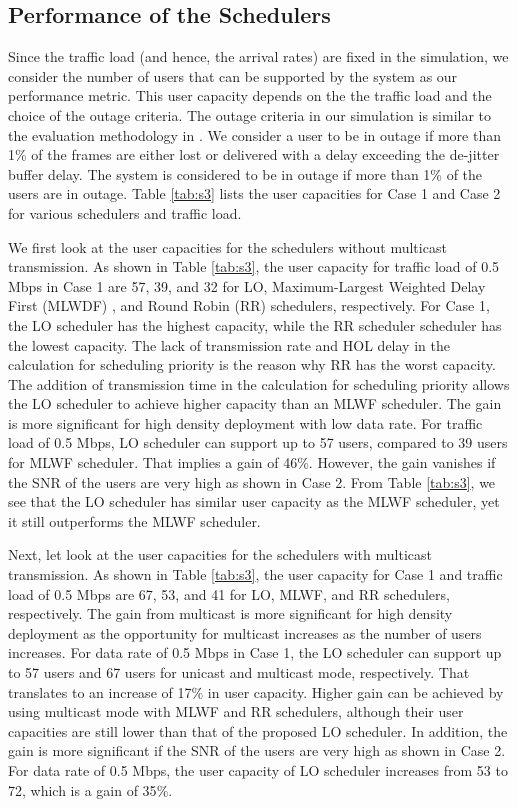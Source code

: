 \documentclass[conference]{IEEEtran}
\newcommand{\0}{\vect{0}}
\newcommand{\1}{\vect{1}}
\begin{document}
\subsection{Performance of the Schedulers}

Since the traffic load (and hence, the arrival rates) are fixed in the simulation, we consider the  number of users that can be supported by the system as our performance metric. This user capacity depends on the the traffic load and the choice of the outage criteria. The outage criteria in our simulation is similar to the evaluation methodology in \cite{3GPPTR25.814}. We consider a user to be in outage if more than 1\% of the frames are either lost or delivered with a delay exceeding the de-jitter buffer delay. The system is considered to be in outage if more than 1\% of the users are in outage. Table \ref{tab:s3} lists the user capacities for Case 1 and Case 2 for various schedulers and traffic load.


We first look at the user capacities for the schedulers without multicast transmission. As shown in Table \ref{tab:s3}, the user capacity for traffic load of 0.5 Mbps in Case 1 are 57, 39, and 32 for LO,  Maximum-Largest Weighted Delay First (MLWDF)  \cite{Sto01AP}, and Round Robin (RR) schedulers, respectively. For Case 1, the LO scheduler has the highest capacity, while the RR scheduler scheduler has the lowest capacity. The lack of transmission rate and HOL delay in the calculation for scheduling priority is the reason why RR has the worst capacity. The addition of transmission time in the calculation for scheduling priority allows the LO scheduler to achieve higher capacity than an MLWF scheduler. The gain is more significant for high density deployment with low data rate. For traffic load of 0.5 Mbps, LO scheduler can support up to 57 users, compared to 39 users for  MLWF scheduler. That implies a gain of 46$\%$. However, the gain vanishes if the SNR of the users are very high as shown in Case 2. From Table \ref{tab:s3}, we see that the LO scheduler has similar user capacity as the MLWF scheduler, yet it still outperforms the MLWF scheduler.


Next, let look at the user capacities for the schedulers with multicast transmission. As shown in Table \ref{tab:s3}, the user capacity for Case 1 and traffic load of 0.5 Mbps are 67, 53, and 41 for LO, MLWF, and RR schedulers, respectively. The gain from multicast  is more significant for high density deployment as the opportunity for multicast increases as the number of users increases. For data rate of 0.5 Mbps in Case 1, the LO scheduler can support up to 57 users and 67 users for unicast and  multicast mode, respectively. That translates to an increase of 17$\%$ in user capacity. Higher gain can be achieved by using multicast mode with MLWF and RR schedulers, although their user capacities are still lower than that of the proposed LO scheduler. In addition, the gain is more significant if the SNR of the users are very high as shown in Case 2. For data rate of 0.5 Mbps, the user capacity of  LO scheduler increases from 53 to 72, which is a gain of 35$\%$.
\end{document}
